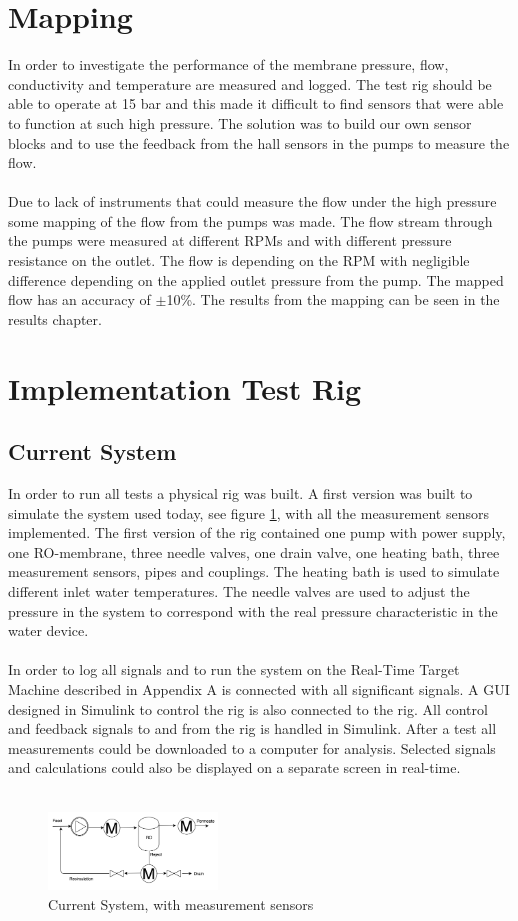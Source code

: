 \section{Mapping}
In order to investigate the performance of the membrane pressure, flow, conductivity and temperature are measured and logged. The test rig should be able to operate at 15 bar and this made it difficult to find sensors that were able to function at such high pressure. The solution was to build our own sensor blocks and to use the feedback from the hall sensors in the pumps to measure the flow. \\
\\
Due to lack of instruments that could measure the flow under the high pressure some mapping of the flow from the pumps was made. The flow stream through the pumps were measured at different RPMs and with different pressure resistance on the outlet. The flow is depending on the RPM with negligible difference depending on the applied outlet pressure from the pump. The mapped flow has an accuracy of $\pm$10\%. The results from the mapping can be seen in the results chapter. 

\section{Implementation Test Rig}
\subsection{Current System}
In order to run all tests a physical rig was built. A first version was built to simulate the system used today, see figure \ref{fig:MeasCurrSys}, with all the measurement sensors implemented. The first version of the rig contained one pump with power supply, one RO-membrane, three needle valves, one drain valve, one heating bath, three measurement sensors, pipes and couplings. The heating bath is used to simulate different inlet water temperatures. The needle valves are used to adjust the pressure in the system to correspond with the real pressure characteristic in the water device. \\
\\
In order to log all signals and to run the system on the Real-Time Target Machine described in Appendix A is connected with all significant signals. A GUI designed in Simulink to control the rig is also connected to the rig. All control and feedback signals to and from the rig is handled in Simulink. After a test all measurements could be downloaded to a computer for analysis. Selected signals and calculations could also be displayed on a separate screen in real-time. \\
\\
\begin{figure}[h]
    \centering
    \includegraphics[width=0.4\textwidth]{MeasCurrSys}
    \caption{Current System, with measurement sensors}
    \label{fig:MeasCurrSys}
\end{figure}

